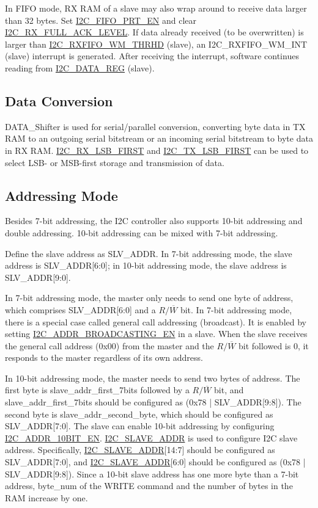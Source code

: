 \documentclass[main\_\_EN.tex]{subfiles}
\begin{document}
In FIFO mode, RX RAM of a slave may also wrap around to receive data larger than 32 bytes. Set \hyperref[fielddesc:I2CFIFOPRTEN]{I2C\_FIFO\_PRT\_EN} and clear \hyperref[fielddesc:I2CRXFULLACKLEVEL]{I2C\_RX\_FULL\_ACK\_LEVEL}. If data already received (to be overwritten) is larger than \hyperref[fielddesc:I2CRXFIFOWMTHRHD]{I2C\_RXFIFO\_WM\_THRHD} (slave), an I2C\_RXFIFO\_WM\_INT (slave) interrupt is generated. After receiving the interrupt, software continues reading from \hyperref[regdesc:I2CDATAREG]{I2C\_DATA\_REG} (slave).

\subsection{Data Conversion}
DATA\_Shifter is used for serial/parallel conversion, converting byte data in TX RAM to an outgoing serial bitstream or an incoming serial bitstream to byte data in RX RAM. \hyperref[fielddesc:I2CRXLSBFIRST]{I2C\_RX\_LSB\_FIRST} and \hyperref[fielddesc:I2CTXLSBFIRST]{I2C\_TX\_LSB\_FIRST} can be used to select LSB- or MSB-first storage and transmission of data.

\subsection{Addressing Mode}
Besides 7-bit addressing, the \chipname{} I2C controller also supports 10-bit addressing and double addressing. 10-bit addressing can be mixed with 7-bit addressing.

Define the slave address as SLV\_ADDR. In 7-bit addressing mode, the slave address is SLV\_ADDR[6:0]; in 10-bit addressing mode, the slave address is SLV\_ADDR[9:0].

In 7-bit addressing mode, the master only needs to send one byte of address, which comprises SLV\_ADDR[6:0] and a $R/\overline W$ bit. In 7-bit addressing mode, there is a special case called general call addressing (broadcast). It is enabled by setting \hyperref[fielddesc:I2CADDRBROADCASTINGEN]{I2C\_ADDR\_BROADCASTING\_EN} in a slave. When the slave receives the general call address (0x{}00) from the master and the $R/\overline W$ bit followed is 0, it responds to the master regardless of its own address.

In 10-bit addressing mode, the master needs to send two bytes of address. The first byte is slave\_addr\_first\_7bits followed by a $R/\overline W$ bit, and slave\_addr\_first\_7bits should be configured as (0x{}78 | SLV\_ADDR[9:8]). The second byte is slave\_addr\_second\_byte, which should be configured as SLV\_ADDR[7:0]. The slave can enable 10-bit addressing by configuring \hyperref[fielddesc:I2CADDR10BITEN]{I2C\_ADDR\_10BIT\_EN}. \hyperref[fielddesc:I2CSLAVEADDR]{I2C\_SLAVE\_ADDR} is used to configure I2C slave address. Specifically, \hyperref[fielddesc:I2CSLAVEADDR]{I2C\_SLAVE\_ADDR}[14:7] should be configured as SLV\_ADDR[7:0], and  \hyperref[fielddesc:I2CSLAVEADDR]{I2C\_SLAVE\_ADDR}[6:0] should be configured as (0x{}78 | SLV\_ADDR[9:8]). Since a 10-bit slave address has one more byte than a 7-bit address, byte\_num of the WRITE command and the number of bytes in the RAM increase by one.
\end{document}
